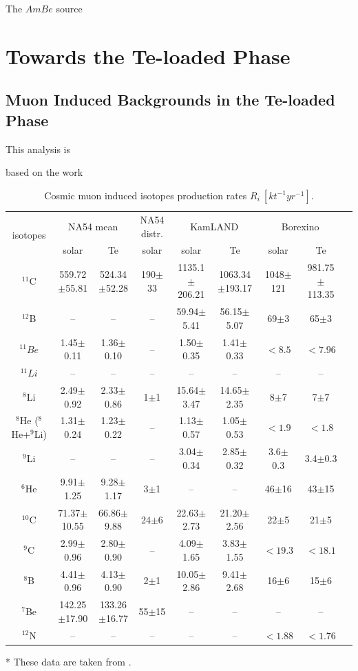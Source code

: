 The $AmBe$ source

\section{Towards the Te-loaded Phase}

\subsection{Muon Induced Backgrounds in the Te-loaded Phase}
This analysis is 

based on the work



\begin{table}[ht]
	\caption{Cosmic muon induced isotopes production rates $R_i~[kt^{-1}yr^{−1}]$.}\label{estimateRates}
	\centering
	\scriptsize
	\begin{tabular*}{170mm}{c@{\extracolsep{\fill}}cccccccc}
		\toprule 
		\multirow{2}{*}{isotopes} &\multicolumn{2}{c}{NA54 mean}& NA54 distr.& \multicolumn{2}{c}{KamLAND}& \multicolumn{2}{c}{Borexino}\\
		\cline{2-3}   \cline{5-6} \cline{7-8}
		& solar & Te & solar  & solar & Te & solar & Te\\
		\midrule
		$^{11}$C &559.72$\pm$55.81 &524.34$\pm$52.28 &190$\pm$33 &1135.1$\pm$206.21 &1063.34$\pm$193.17& 1048$\pm$121 &981.75$\pm$113.35\\
		$^{12}$B & -- & -- & -- & 59.94$\pm$5.41& 56.15$\pm$5.07 &69$\pm$3 &65$\pm$3\\
		$^{11}Be$&  1.45$\pm$0.11& 1.36$\pm$0.10& -- &1.50$\pm$0.35 &1.41$\pm$0.33& $<8.5$ & $<7.96$ \\
                $^{11}Li$ & -- & -- & -- & -- & -- & -- & --\\
		$^8$Li & 2.49$\pm$0.92 & 2.33$\pm$0.86 & 1$\pm$1 & 15.64$\pm$3.47 & 14.65$\pm$2.35 & 8$\pm$7 & 7$\pm$7\\
		$^8$He ($^8$He+$^9$Li) & 1.31$\pm$0.24 & 1.23$\pm$0.22 & -- & 1.13$\pm$0.57 & 1.05$\pm$0.53 & $<1.9$ & $<1.8$\\
		$^9$Li & --&  --&  --&  3.04$\pm$0.34 & 2.85$\pm$0.32 & 3.6$\pm$0.3 & 3.4$\pm$0.3\\
        $^6$He & 9.91$\pm$1.25 & 9.28$\pm$1.17 & 3$\pm$1 &-- &-- &46$\pm$16 & 43$\pm$15\\
		$^{10}$C & 71.37$\pm$10.55 & 66.86$\pm$9.88 & 24$\pm$6 & 22.63$\pm$2.73 & 21.20$\pm$2.56 & 22$\pm$5 & 21$\pm$5\\
        $^9$C & 2.99$\pm$0.96 & 2.80$\pm$0.90 & -- & 4.09$\pm$1.65 & 3.83$\pm$1.55 & $<19.3$ & $<18.1$\\
        $^8$B & 4.41$\pm$0.96 & 4.13$\pm$0.90 & 2$\pm$1 & 10.05$\pm$2.86 & 9.41$\pm$2.68 & 16$\pm$6 & 15$\pm$6\\
		$^7$Be &142.25$\pm$17.90 & 133.26$\pm$16.77 & 55$\pm$15 & -- & -- & -- & --\\
		$^{12}$N & -- &--& --& --& --& $<1.88$ & $<1.76$\\
		\bottomrule
	\end{tabular*}
\end{table}
* These data are taken from \cite{nndc}.

